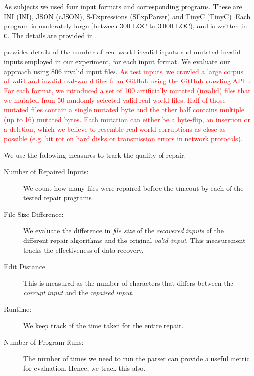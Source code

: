 \documentclass[sigconf,review,anonymous]{acmart}
\def\<#1>{\texttt{#1}}
\newcounter{todocounter}
\newcommand{\todo}[1]{\marginpar{$|$}\textcolor{red}{\stepcounter{todocounter}\footnote[\thetodocounter]{\textcolor{red}{\textbf{TODO }}\textit{#1}}}}
\newcommand{\recheck}[1]{\textcolor{red}{#1}}
\renewcommand{\todo}[1]{}
\begin{document}
As subjects we used four input formats and corresponding programs.
These are INI (INI), JSON (cJSON), S-Expressions (SExpParser) and TinyC (TinyC).
Each program is moderately large (between 300 LOC to 3,000 LOC), and is written in \<C>.
The details are provided in .

 provides details of the number of
real-world invalid inputs and mutated invalid inputs employed in our experiment,
for each input format. We evaluate our approach using 806 invalid input files.
\recheck{
As test inputs, we crawled a large corpus of valid and invalid real-world files
from GitHub using the GitHub crawling API~\cite{githubapi}.
For each format, we introduced a set of 100 artificially mutated (invalid) files
that we mutated from 50 randomly selected valid real-world files.
Half of those mutated files contain a single mutated byte and the other half
contains multiple (up to 16) mutated bytes.
Each mutation can either be a byte-flip, an insertion or a deletion, which
we believe to resemble real-world corruptions as close as possible
(e.g. bit rot on hard disks or transmission errors in network protocols).}



We use the following measures to track the quality of repair.
\begin{description}
\item[Number of Repaired Inputs:] We count how many files were repaired before
the timeout by each of the tested repair programs.
\item[File Size Difference:] We evaluate the difference in \emph{file size} of
the \emph{recovered inputs} of the different repair algorithms and the original
\emph{valid input}. This measurement tracks the effectiveness of data recovery.
\item[Edit Distance:] This is measured as the number of characters that
differs between the \emph{corrupt input} and the \emph{repaired input}.
\item[Runtime:] We keep track of the time taken for the entire repair.
\item[Number of Program Runs:] The number of times we need to run the
parser can provide a useful metric for evaluation. Hence, we track this also.
\end{description}
\end{document}
